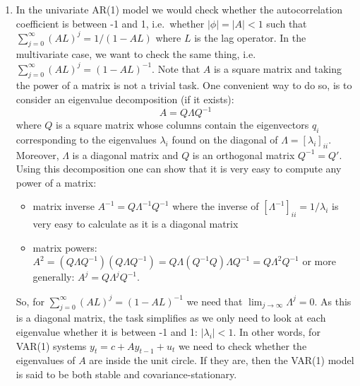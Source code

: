 \begin{enumerate}
\item 
In the univariate AR(1) model we would check whether the autocorrelation coefficient is between -1 and 1,
  i.e.\ whether \(|\phi| = |A|<1\) such that \(\sum_{j=0}^\infty (AL)^j=1/(1-AL)\) where \(L\) is the lag operator.
In the multivariate case, we want to check the same thing,
  i.e. \(\sum_{j=0}^\infty (AL)^j=(1-AL)^{-1}\).
Note that \(A\) is a square matrix and taking the power of a matrix is not a trivial task.
One convenient way to do so, is to consider an eigenvalue decomposition (if it exists):
\[A= Q \Lambda Q^{-1}\]
  where \(Q\) is a square matrix whose columns contain the eigenvectors \(q_i\)
  corresponding to the eigenvalues \(\lambda_i\) found on the diagonal of \(\Lambda = {[\lambda_i]}_{ii}\).
Moreover, \(\Lambda \) is a diagonal matrix and \(Q\) is an orthogonal matrix \(Q^{-1}=Q'\).
Using this decomposition one can show that it is very easy to compute any power of a matrix:
\begin{itemize}
    \item matrix inverse \(A^{-1} = Q \Lambda^{-1} Q^{-1}\) where the inverse of \([\Lambda^{-1}]_{ii} = 1/\lambda_i\) is very easy to calculate as it is a diagonal matrix
    \item matrix powers: \(A^2=(Q\Lambda Q^{-1})(Q\Lambda Q^{-1})=Q\Lambda (Q^{-1}Q) \Lambda Q^{-1} = Q \Lambda^2 Q^{-1}\) or more generally: \(A^j = Q \Lambda^j Q^{-1}\).
\end{itemize}
So, for \(\sum_{j=0}^\infty {(AL)}^j=(1-AL)^{-1}\) we need that \(\lim_{j\rightarrow \infty}\Lambda^j=0\).
As this is a diagonal matrix, the task simplifies as we only need to look at each eigenvalue whether it is between -1 and 1: \(|\lambda_i|<1\).
In other words, for VAR(1) systems \(y_t = c + A y_{t-1} + u_t\) we need to check whether the eigenvalues of \(A\) are inside the unit circle.
If they are, then the VAR(1) model is said to be both stable and covariance-stationary.
	

\end{enumerate}

